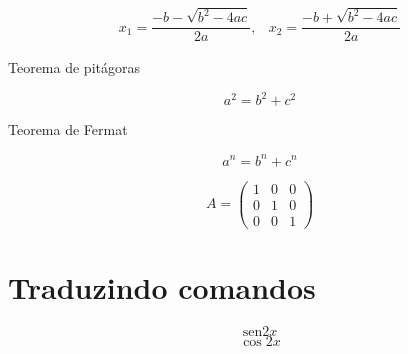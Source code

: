 \documentclass{article}
\begin{document}
	\begin{equation*}
	\begin{array}{cc}
	x_1 = \dfrac{-b - \sqrt{b^2-4ac}}{2a}, & x_2 = \dfrac{-b + \sqrt{b^2-4ac}}{2a}
	\end{array} 
	\end{equation*}
	
	Teorema de pitágoras
	
	\begin{equation*}
		a^2=b^2+c^2
	\end{equation*}
	
	Teorema de Fermat
	
	\begin{equation}
	a^n=b^n+c^n
	\end{equation}
	
	\begin{equation*}
		A = \begin{pmatrix}
		1 & 0 & 0 \\ 
		0 & 1 & 0 \\ 
		0 & 0 & 1
		\end{pmatrix} 
	\end{equation*}
	
	\section{Traduzindo comandos}
	\renewcommand{\sin}{\mathrm{sen}}
	
	\begin{equation}
		\sin 2x
	\end{equation}
	\begin{equation}
		\cos 2x
	\end{equation}
\end{document}
